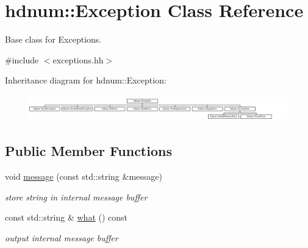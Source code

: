 \hypertarget{classhdnum_1_1Exception}{
\section{hdnum::Exception Class Reference}
\label{classhdnum_1_1Exception}
}


Base class for Exceptions.  




{\ttfamily \#include $<$exceptions.hh$>$}

Inheritance diagram for hdnum::Exception:\begin{figure}[H]
\begin{center}
\leavevmode
\includegraphics[height=1.14754cm]{classhdnum_1_1Exception}
\end{center}
\end{figure}
\subsection*{Public Member Functions}
\begin{DoxyCompactItemize}
\item 
\hypertarget{classhdnum_1_1Exception_a1761e43f1a7727c2ee39f32466df8c55}{
void \hyperlink{classhdnum_1_1Exception_a1761e43f1a7727c2ee39f32466df8c55}{message} (const std::string \&message)}
\label{classhdnum_1_1Exception_a1761e43f1a7727c2ee39f32466df8c55}

\begin{DoxyCompactList}\small\item\em store string in internal message buffer \item\end{DoxyCompactList}\item 
\hypertarget{classhdnum_1_1Exception_aa6f1c6150981b76282a20440c9b5e8ab}{
const std::string \& \hyperlink{classhdnum_1_1Exception_aa6f1c6150981b76282a20440c9b5e8ab}{what} () const }
\label{classhdnum_1_1Exception_aa6f1c6150981b76282a20440c9b5e8ab}

\begin{DoxyCompactList}\small\item\em output internal message buffer \item\end{DoxyCompactList}\end{DoxyCompactItemize}


